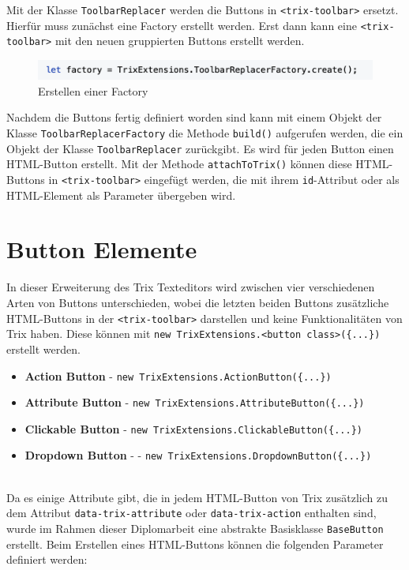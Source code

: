 Mit der Klasse \texttt{ToolbarReplacer} werden die Buttons in \texttt{<trix-toolbar>} ersetzt. Hierfür muss zunächst eine Factory erstellt werden. Erst dann kann eine \texttt{<trix-toolbar>} mit den neuen gruppierten Buttons erstellt werden.

\begin{figure}[H]
\begin{center}
	\includegraphics[scale=.7]{images/toolbar_replacer_factory.png}
\end{center}
	\caption{Erstellen einer Factory} 
\end{figure}

Nachdem die Buttons fertig definiert worden sind kann mit einem Objekt der Klasse \texttt{ToolbarReplacerFactory} 
die Methode \texttt{build()} aufgerufen werden, die ein Objekt der Klasse \texttt{ToolbarReplacer} zurückgibt. Es wird  
für jeden Button einen HTML-Button erstellt. Mit der Methode \texttt{attachToTrix()} können diese HTML-Buttons in  
\texttt{<trix-toolbar>} eingefügt werden, die mit ihrem \texttt{id}-Attribut oder als HTML-Element als Parameter 
übergeben wird.

\section{Button Elemente}
\label{subsec:buttons}
In dieser Erweiterung des Trix Texteditors wird zwischen vier verschiedenen Arten von Buttons unterschieden, wobei 
die  letzten beiden Buttons zusätzliche HTML-Buttons in der \texttt{<trix-toolbar>} darstellen und keine 
Funktionalitäten 
von Trix haben. Diese können mit \texttt{new TrixExtensions.<button class>(\{...\})} erstellt werden.

\begin{itemize}
	\item{\textbf{Action Button}} - \texttt{new TrixExtensions.ActionButton(\{...\})}
	\item{\textbf{Attribute Button}} - \texttt{new TrixExtensions.AttributeButton(\{...\})}
	\item{\textbf{Clickable Button}} - \texttt{new TrixExtensions.ClickableButton(\{...\})}
	\item{\textbf{Dropdown Button}} - - \texttt{new TrixExtensions.DropdownButton(\{...\})}
\end{itemize}

\mbox{}\\
Da es einige Attribute gibt, die in jedem HTML-Button von Trix zusätzlich zu dem Attribut \texttt{data-trix-attribute} 
oder 
\texttt{data-trix-action} enthalten sind, wurde im Rahmen dieser Diplomarbeit eine abstrakte Basisklasse 
\texttt{BaseButton} 
erstellt. Beim Erstellen eines HTML-Buttons können die folgenden Parameter definiert werden:

